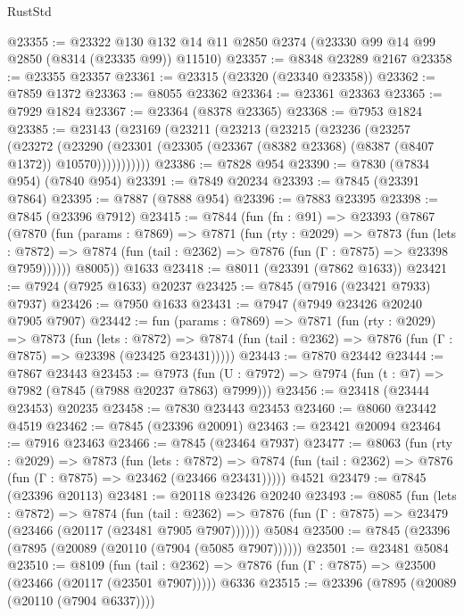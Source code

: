 \begin{lexlean}{RustStd}
\begin{coremodule}
@23355 := @23322
    @130
    @132
    @14
    @11
    @2850
    @2374
    (@23330 @99 @14 @99 @2850 (@8314 (@23335 @99)) @11510)
@23357 := @8348 @23289 @2167
@23358 := @23355 @23357
@23361 := @23315 (@23320 (@23340 @23358))
@23362 := @7859 @1372
@23363 := @8055 @23362
@23364 := @23361 @23363
@23365 := @7929 @1824
@23367 := @23364 (@8378 @23365)
@23368 := @7953 @1824
@23385 := @23143
    (@23169
      (@23211
        (@23213
          (@23215
            (@23236
              (@23257
                (@23272
                  (@23290
                    (@23301 (@23305 (@23367 (@8382 @23368) (@8387 (@8407 @1372)) @10570)))))))))))
@23386 := @7828 @954
@23390 := @7830 (@7834 @954) (@7840 @954)
@23391 := @7849 @20234
@23393 := @7845 (@23391 @7864)
@23395 := @7887 (@7888 @954)
@23396 := @7883 @23395
@23398 := @7845 (@23396 @7912)
@23415 := @7844
    (fun (fn : @91) =>
    @23393
      (@7867
        (@7870
          (fun (params : @7869) =>
          @7871
            (fun (rty : @2029) =>
            @7873
              (fun (lets : @7872) =>
              @7874 (fun (tail : @2362) => @7876 (fun (Γ : @7875) => @23398 @7959))))))
        @8005))
    @1633
@23418 := @8011 (@23391 (@7862 @1633))
@23421 := @7924 (@7925 @1633) @20237
@23425 := @7845 (@7916 (@23421 @7933) @7937)
@23426 := @7950 @1633
@23431 := @7947 (@7949 @23426 @20240 @7905 @7907)
@23442 := fun (params : @7869) =>
  @7871
    (fun (rty : @2029) =>
    @7873
      (fun (lets : @7872) =>
      @7874 (fun (tail : @2362) => @7876 (fun (Γ : @7875) => @23398 (@23425 @23431)))))
@23443 := @7870 @23442
@23444 := @7867 @23443
@23453 := @7973
    (fun (U : @7972) => @7974 (fun (t : @7) => @7982 (@7845 (@7988 @20237 @7863) @7999)))
@23456 := @23418 (@23444 @23453) @20235
@23458 := @7830 @23443 @23453
@23460 := @8060 @23442 @4519
@23462 := @7845 (@23396 @20091)
@23463 := @23421 @20094
@23464 := @7916 @23463
@23466 := @7845 (@23464 @7937)
@23477 := @8063
    (fun (rty : @2029) =>
    @7873
      (fun (lets : @7872) =>
      @7874 (fun (tail : @2362) => @7876 (fun (Γ : @7875) => @23462 (@23466 @23431)))))
    @4521
@23479 := @7845 (@23396 @20113)
@23481 := @20118 @23426 @20240
@23493 := @8085
    (fun (lets : @7872) =>
    @7874
      (fun (tail : @2362) =>
      @7876 (fun (Γ : @7875) => @23479 (@23466 (@20117 (@23481 @7905 @7907))))))
    @5084
@23500 := @7845 (@23396 (@7895 (@20089 (@20110 (@7904 (@5085 @7907))))))
@23501 := @23481 @5084
@23510 := @8109
    (fun (tail : @2362) => @7876 (fun (Γ : @7875) => @23500 (@23466 (@20117 (@23501 @7907)))))
    @6336
@23515 := @23396 (@7895 (@20089 (@20110 (@7904 @6337))))

\end{coremodule}
\end{lexlean}
